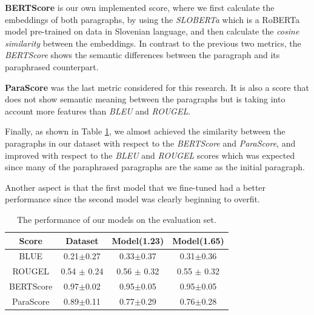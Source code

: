 \documentclass[fleqn,moreauthors,10pt]{ds_report}
\begin{document}
\par \textbf{BERTScore} is our own implemented score, where we first calculate the embeddings of both paragraphs, by using the \textit{SLOBERTa} \cite{ulvcar2021sloberta} which is a RoBERTa model pre-trained on data in Slovenian language, and then calculate the \textit{cosine similarity} between the embeddings. In contrast to the previous two metrics, the \textit{BERTScore} shows the semantic differences between the paragraph and its paraphrased counterpart.
\par \textbf{ParaScore} \cite{parascore} was the last metric considered for this research. It is also a score that does not show semantic meaning between the paragraphs but is taking into account more features than \textit{BLEU}
and \textit{ROUGEL}.
\par
Finally, as shown in Table \ref{tab:res}, we almost achieved the similarity between the paragraphs in our dataset with respect to the \textit{BERTScore} and \textit{ParaScore}, and improved with respect to the \textit{BLEU} and \textit{ROUGEL} scores which was expected since many of the paraphrased paragraphs are the same as the initial paragraph. 
\par
Another aspect is that the first model that we fine-tuned had a better performance since the second model was clearly beginning to overfit.
%
\begin{table}[!hbt]
    \centering
    \begin{tabular}{|c|c|c|c|}
       \hline
        Score & Dataset & Model(1.23) & Model(1.65)  \\\hline\hline
        BLUE & 0.21$\pm$0.27  & 0.33$\pm$0.37 & 0.31$\pm$0.36 \\\hline
        ROUGEL & 0.54 $\pm$ 0.24 & 0.56 $\pm$ 0.32 & 0.55 $\pm$ 0.32 \\\hline        BERTScore & 0.97$\pm$0.02 & 0.95$\pm$0.05  & 0.95$\pm$0.05 \\\hline
        ParaScore & 0.89$\pm$0.11 & 0.77$\pm$0.29 & 0.76$\pm$0.28 \\\hline
    \end{tabular}
    \caption{The performance of our models on the evaluation set.}
    \label{tab:res}
\end{table}
\end{document}
